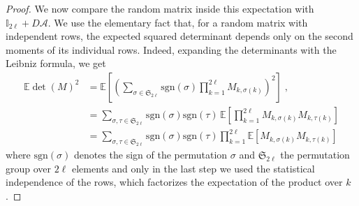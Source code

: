 \documentclass[aps,prl,twocolumn,superscriptaddress,reprint,longbibliography,nofootinbib]{revtex4-2}
\begin{document}
\begin{proof}
We now compare the random matrix inside this expectation with
$\mathbb{I}_{2\ell}+D\mathcal{A}$. We use the elementary fact that, for
a random matrix with independent rows, the expected squared
determinant depends only on the second moments of its individual
rows. Indeed, expanding the determinants with the Leibniz formula, we get
\begin{equation}
\begin{split}
    \mathbb{E}\det(M)^2
&=
\mathbb{E}\!\left[\left(\sum_{\sigma\in\mathfrak{S}_{2\ell}}
\mathrm{sgn}(\sigma)
\prod_{k=1}^{2\ell}
M_{k,\sigma(k)}
\right)^2\right]\;,\\
&=\sum_{\sigma,\tau\in \mathfrak{S}_{2\ell}} \mathrm{sgn}(\sigma) \mathrm{sgn}(\tau)\,
\mathbb{E}\!\left[\prod_{k=1}^{2\ell}M_{k,\sigma(k)}M_{k,\tau(k)}\right]\\
&=\sum_{\sigma,\tau\in \mathfrak{S}_{2\ell}} \mathrm{sgn}(\sigma) \mathrm{sgn}(\tau)
\prod_{k=1}^{2\ell}
\mathbb{E}\!\left[M_{k,\sigma(k)}M_{k,\tau(k)}\right]
\end{split}
\end{equation}
where $\mathrm{sgn}(\sigma)$ denotes the sign of the permutation $\sigma$ and $\mathfrak{S}_{2\ell}$ the permutation group over $2\ell$ elements and only in the last step we used the statistical independence of the rows, which factorizes the expectation of the product over $k$.


\end{proof}
\end{document}
